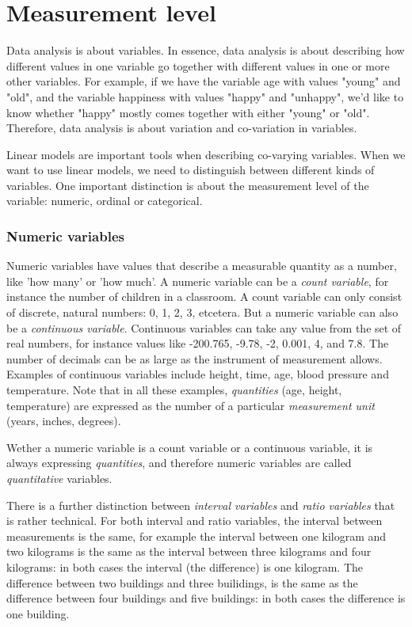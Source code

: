 \documentclass[]{report}\usepackage[]{graphicx}\usepackage[]{color}
\begin{document}
\section{Measurement level}


Data analysis is about variables. In essence, data analysis is about describing how different values in one variable go together with different values in one or more other variables. For example, if we have the variable age with values "young" and "old", and the variable happiness with values "happy" and "unhappy", we'd like to know whether "happy" mostly comes together with either "young" or "old". Therefore, data analysis is about variation and co-variation in variables.

Linear models are important tools when describing co-varying variables. When we want to use linear models, we need to distinguish between different kinds of variables. One important distinction is about the measurement level of the variable: numeric, ordinal or categorical.


\subsubsection{Numeric variables}

Numeric variables have values that describe a measurable quantity as a number, like 'how many' or 'how much'. A numeric variable can be a \textit{count variable}, for instance the number of children in a classroom. A count variable can only consist of discrete, natural numbers: 0, 1, 2, 3, etcetera. But a numeric variable can also be a \textit{continuous variable}. Continuous variables can take any value from the set of real numbers, for instance values like -200.765, -9.78, -2, 0.001, 4, and 7.8. The number of decimals can be as large as the instrument of measurement allows. Examples of continuous variables include height, time, age, blood pressure and temperature. Note that in all these examples, \textit{quantities} (age, height, temperature) are expressed as the number of a particular \textit{measurement unit} (years, inches, degrees).

Wether a numeric variable is a count variable or a continuous variable, it is always expressing \textit{quantities}, and therefore numeric variables are called \textit{quantitative} variables.

There is a further distinction between \textit{interval variables} and \textit{ratio variables} that is rather technical. For both interval and ratio variables, the interval between measurements is the same, for example the interval between one kilogram and two kilograms is the same as the interval between three kilograms and four kilograms: in both cases the interval (the difference) is one kilogram. The difference between two buildings and three builidings, is the same as the difference between four buildings and five buildings: in both cases the difference is one building.
\end{document}
